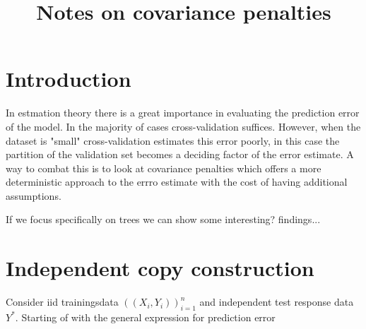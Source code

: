 \documentclass{article}
\title{Notes on covariance penalties}
\theoremstyle{definition}
\theoremstyle{remark}
\begin{document}
\maketitle


\section{Introduction}
In estmation theory there is a great importance in evaluating the prediction
error of the model. In the majority of cases cross-validation suffices. However,
when the dataset is "small" cross-validation estimates this error poorly, in
this case the partition of the validation set becomes a deciding factor of the
error estimate. A way to combat this is to look at covariance penalties which
offers a more deterministic approach to the errro estimate with the cost of
having additional assumptions.

If we focus specifically on trees we can show some interesting? findings...

\section{Independent copy construction}
Consider iid trainingsdata $\left((X_i, Y_i)\right)_{i=1}^n$ and independent test response data $Y^*$. Starting of with the general expression for prediction error
\end{document}
